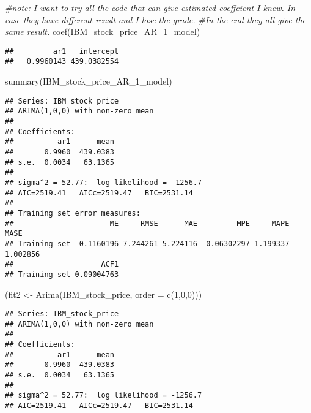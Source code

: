 \documentclass[
]{article}
\newenvironment{Shaded}{\begin{snugshade}}{\end{snugshade}}
\newcommand{\AttributeTok}[1]{\textcolor[rgb]{0.77,0.63,0.00}{#1}}
\newcommand{\CommentTok}[1]{\textcolor[rgb]{0.56,0.35,0.01}{\textit{#1}}}
\newcommand{\DecValTok}[1]{\textcolor[rgb]{0.00,0.00,0.81}{#1}}
\newcommand{\FunctionTok}[1]{\textcolor[rgb]{0.00,0.00,0.00}{#1}}
\newcommand{\NormalTok}[1]{#1}
\newcommand{\OtherTok}[1]{\textcolor[rgb]{0.56,0.35,0.01}{#1}}
\begin{document}
\begin{Shaded}
\begin{Highlighting}[]
\CommentTok{\#note: I want to try all the code that can give estimated coeffcient I knew. In case they have different reuslt and I lose the grade.}
\CommentTok{\#In the end they all give the same result.}
\FunctionTok{coef}\NormalTok{(IBM\_stock\_price\_AR\_1\_model)}
\end{Highlighting}
\end{Shaded}

\begin{verbatim}
##         ar1   intercept 
##   0.9960143 439.0382554
\end{verbatim}

\begin{Shaded}
\begin{Highlighting}[]
\FunctionTok{summary}\NormalTok{(IBM\_stock\_price\_AR\_1\_model)}
\end{Highlighting}
\end{Shaded}

\begin{verbatim}
## Series: IBM_stock_price 
## ARIMA(1,0,0) with non-zero mean 
## 
## Coefficients:
##          ar1      mean
##       0.9960  439.0383
## s.e.  0.0034   63.1365
## 
## sigma^2 = 52.77:  log likelihood = -1256.7
## AIC=2519.41   AICc=2519.47   BIC=2531.14
## 
## Training set error measures:
##                      ME     RMSE      MAE         MPE     MAPE     MASE
## Training set -0.1160196 7.244261 5.224116 -0.06302297 1.199337 1.002856
##                    ACF1
## Training set 0.09004763
\end{verbatim}

\begin{Shaded}
\begin{Highlighting}[]
\NormalTok{(fit2 }\OtherTok{\textless{}{-}} \FunctionTok{Arima}\NormalTok{(IBM\_stock\_price, }\AttributeTok{order =} \FunctionTok{c}\NormalTok{(}\DecValTok{1}\NormalTok{,}\DecValTok{0}\NormalTok{,}\DecValTok{0}\NormalTok{)))}
\end{Highlighting}
\end{Shaded}

\begin{verbatim}
## Series: IBM_stock_price 
## ARIMA(1,0,0) with non-zero mean 
## 
## Coefficients:
##          ar1      mean
##       0.9960  439.0383
## s.e.  0.0034   63.1365
## 
## sigma^2 = 52.77:  log likelihood = -1256.7
## AIC=2519.41   AICc=2519.47   BIC=2531.14
\end{verbatim}
\end{document}
